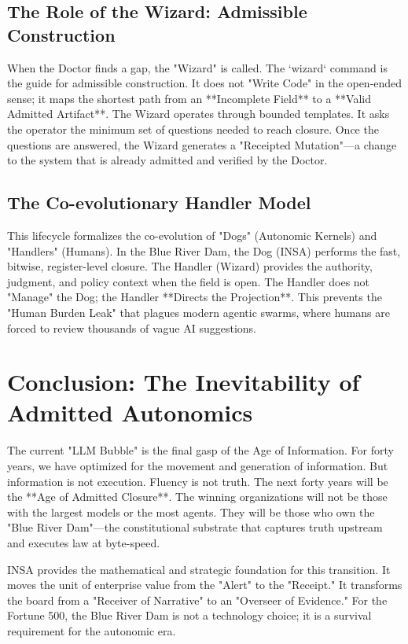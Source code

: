 \documentclass[12pt,a4paper,oneside]{book}
\begin{document}
\section{The Role of the Wizard: Admissible Construction}
When the Doctor finds a gap, the "Wizard" is called. The `wizard` command is the guide for admissible construction. It does not "Write Code" in the open-ended sense; it maps the shortest path from an **Incomplete Field** to a **Valid Admitted Artifact**. The Wizard operates through bounded templates. It asks the operator the minimum set of questions needed to reach closure. Once the questions are answered, the Wizard generates a "Receipted Mutation"---a change to the system that is already admitted and verified by the Doctor. 

\section{The Co-evolutionary Handler Model}
This lifecycle formalizes the co-evolution of "Dogs" (Autonomic Kernels) and "Handlers" (Humans). In the Blue River Dam, the Dog (INSA) performs the fast, bitwise, register-level closure. The Handler (Wizard) provides the authority, judgment, and policy context when the field is open. The Handler does not "Manage" the Dog; the Handler **Directs the Projection**. This prevents the "Human Burden Leak" that plagues modern agentic swarms, where humans are forced to review thousands of vague AI suggestions.

\chapter{Conclusion: The Inevitability of Admitted Autonomics}

The current "LLM Bubble" is the final gasp of the Age of Information. For forty years, we have optimized for the movement and generation of information. But information is not execution. Fluency is not truth. The next forty years will be the **Age of Admitted Closure**. The winning organizations will not be those with the largest models or the most agents. They will be those who own the "Blue River Dam"---the constitutional substrate that captures truth upstream and executes law at byte-speed. 

INSA provides the mathematical and strategic foundation for this transition. It moves the unit of enterprise value from the "Alert" to the "Receipt." It transforms the board from a "Receiver of Narrative" to an "Overseer of Evidence." For the Fortune 500, the Blue River Dam is not a technology choice; it is a survival requirement for the autonomic era.
\end{document}
